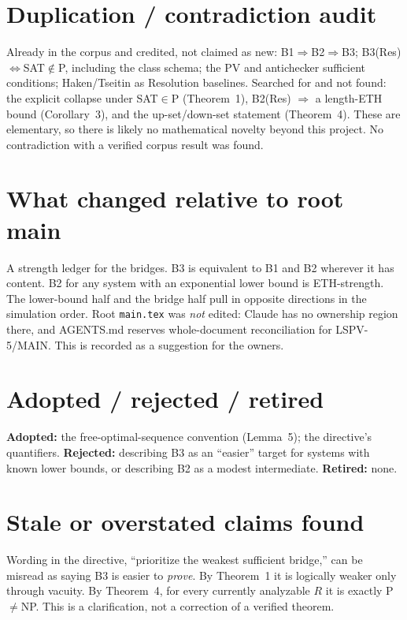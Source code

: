 \documentclass[11pt]{article}
\theoremstyle{definition}
\begin{document}
\section{Duplication / contradiction audit}
Already in the corpus and credited, not claimed as new: B1$\Rightarrow$B2$\Rightarrow$B3;
B3(Res)$\iff$SAT$\notin$P, including the class schema; the PV and antichecker
sufficient conditions; Haken/Tseitin as Resolution baselines. Searched for
and not found: the explicit collapse under SAT$\in$P (Theorem~1), B2(Res)
$\Rightarrow$ a length-ETH bound (Corollary~3), and the up-set/down-set
statement (Theorem~4). These are elementary, so there is likely no
mathematical novelty beyond this project. No contradiction with a verified
corpus result was found.

\section{What changed relative to root main}
A strength ledger for the bridges. B3 is equivalent to B1 and B2 wherever it
has content. B2 for any system with an exponential lower bound is
ETH-strength. The lower-bound half and the bridge half pull in opposite
directions in the simulation order. Root \texttt{main.tex} was \emph{not}
edited: Claude has no ownership region there, and AGENTS.md reserves
whole-document reconciliation for LSPV-5/MAIN. This is recorded as a
suggestion for the owners.

\section{Adopted / rejected / retired}
\textbf{Adopted:} the free-optimal-sequence convention (Lemma~5); the
directive's quantifiers. \textbf{Rejected:} describing B3 as an
``easier'' target for systems with known lower bounds, or describing B2 as a
modest intermediate. \textbf{Retired:} none.

\section{Stale or overstated claims found}
Wording in the directive, ``prioritize the weakest sufficient bridge,'' can
be misread as saying B3 is easier to \emph{prove}. By Theorem~1 it is
logically weaker only through vacuity. By Theorem~4, for every currently
analyzable $R$ it is exactly P$\ne$NP. This is a clarification, not a
correction of a verified theorem.
\end{document}
